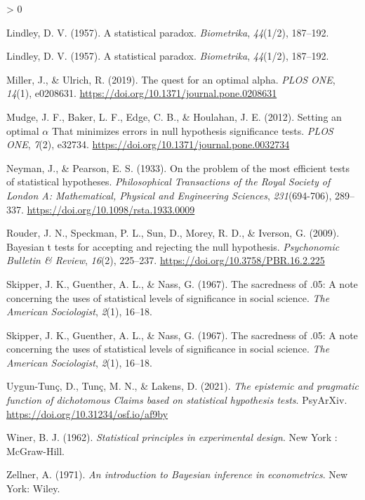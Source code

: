 \documentclass[
  english,
  ,man, a4paper,floatsintext]{apa6}
\newlength{\cslhangindent}
\newenvironment{CSLReferences}[2] %
 {%
  \setlength{\parindent}{0pt}
  \ifodd #1 \everypar{\setlength{\hangindent}{\cslhangindent}}\ignorespaces\fi
  \ifnum #2 > 0
  \setlength{\parskip}{#2\baselineskip}
  \fi
 }%
 {}
\begin{document}
\begin{CSLReferences}{1}{0}
\leavevmode\hypertarget{ref-lindley_statistical_1957}{}%
Lindley, D. V. (1957). A statistical paradox. \emph{Biometrika}, \emph{44}(1/2), 187--192.

\leavevmode\hypertarget{ref-lindley_statistical_1957}{}%
Lindley, D. V. (1957). A statistical paradox. \emph{Biometrika}, \emph{44}(1/2), 187--192.

\leavevmode\hypertarget{ref-miller_quest_2019}{}%
Miller, J., \& Ulrich, R. (2019). The quest for an optimal alpha. \emph{PLOS ONE}, \emph{14}(1), e0208631. \url{https://doi.org/10.1371/journal.pone.0208631}

\leavevmode\hypertarget{ref-mudge_setting_2012}{}%
Mudge, J. F., Baker, L. F., Edge, C. B., \& Houlahan, J. E. (2012). Setting an optimal {\(\alpha\)} {That minimizes errors} in {null hypothesis significance tests}. \emph{PLOS ONE}, \emph{7}(2), e32734. \url{https://doi.org/10.1371/journal.pone.0032734}

\leavevmode\hypertarget{ref-neyman_problem_1933}{}%
Neyman, J., \& Pearson, E. S. (1933). On the problem of the most efficient tests of statistical hypotheses. \emph{Philosophical Transactions of the Royal Society of London A: Mathematical, Physical and Engineering Sciences}, \emph{231}(694-706), 289--337. \url{https://doi.org/10.1098/rsta.1933.0009}

\leavevmode\hypertarget{ref-rouder_bayesian_2009}{}%
Rouder, J. N., Speckman, P. L., Sun, D., Morey, R. D., \& Iverson, G. (2009). Bayesian t tests for accepting and rejecting the null hypothesis. \emph{Psychonomic Bulletin \& Review}, \emph{16}(2), 225--237. \url{https://doi.org/10.3758/PBR.16.2.225}

\leavevmode\hypertarget{ref-skipper_sacredness_1967}{}%
Skipper, J. K., Guenther, A. L., \& Nass, G. (1967). The sacredness of .05: A note concerning the uses of statistical levels of significance in social science. \emph{The American Sociologist}, \emph{2}(1), 16--18.

\leavevmode\hypertarget{ref-skipper_sacredness_1967}{}%
Skipper, J. K., Guenther, A. L., \& Nass, G. (1967). The sacredness of .05: A note concerning the uses of statistical levels of significance in social science. \emph{The American Sociologist}, \emph{2}(1), 16--18.

\leavevmode\hypertarget{ref-tunc_epistemic_2021}{}%
Uygun-Tunç, D., Tunç, M. N., \& Lakens, D. (2021). \emph{The epistemic and pragmatic function of dichotomous {Claims} based on statistical hypothesis tests}. PsyArXiv. \url{https://doi.org/10.31234/osf.io/af9by}

\leavevmode\hypertarget{ref-winer_statistical_1962}{}%
Winer, B. J. (1962). \emph{Statistical principles in experimental design}. {New York : McGraw-Hill}.

\leavevmode\hypertarget{ref-zellner_introduction_1971}{}%
Zellner, A. (1971). \emph{An introduction to {Bayesian} inference in econometrics}. {New York}: {Wiley}.

\end{CSLReferences}

\endgroup
\end{document}
